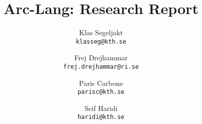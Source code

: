 \documentclass{article}
\title{Arc-Lang: Research Report}
\author{
  Klas Segeljakt\\\texttt{klasseg@kth.se}
  \and
  Frej Drejhammar\\\texttt{frej.drejhammar@ri.se}
  \and
  Paris Carbone\\\texttt{parisc@kth.se}
  \and
  Seif Haridi\\\texttt{haridi@kth.se}
}
\begin{document}
\maketitle
















\cite{CDA-Midterm}



\end{document}
